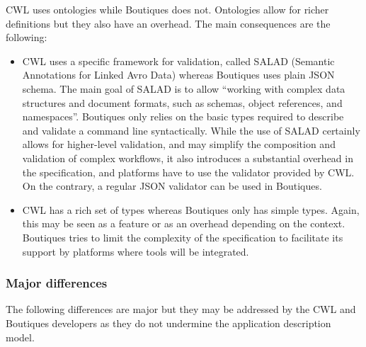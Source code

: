 \documentclass[a4paper,num-refs]{oup-contemporary}
\newcommand{\boutiques}{Boutiques\xspace}
\begin{document}
CWL uses ontologies while \boutiques does not. Ontologies allow for
richer definitions but they also have an overhead. The main
consequences are the following:
\begin{itemize}
\item CWL uses a specific framework for
validation, called SALAD (Semantic Annotations for Linked Avro Data)
whereas \boutiques uses plain JSON schema. The main goal of SALAD is to
allow ``working with complex data structures and document formats, such
as schemas, object references, and namespaces''. \boutiques only relies
on the basic types required to describe and validate a command line
syntactically. While the use of SALAD certainly allows for
higher-level validation, and may simplify the composition and
validation of complex workflows, it also introduces a substantial
overhead in the specification, and platforms have to use the validator
provided by CWL. On the contrary, a regular JSON validator can be used in \boutiques.
\item  CWL has a rich set of types whereas \boutiques only has simple
types. Again, this may be seen as a feature or as an overhead
depending on the context. \boutiques tries to limit the complexity of
the specification to facilitate its support by platforms where tools
will be integrated.
\end{itemize}

\subsubsection{Major differences}

The following differences are major but they may be addressed by the
CWL and \boutiques developers as they do not undermine the application
description model.
\end{document}
